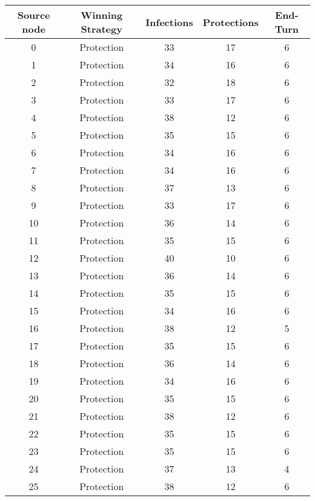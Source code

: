\documentclass[results.tex]{subfiles}
\begin{document}
\begin{center}
  \begin{tabular}{| c || c | c | c | c |}
    \hline
    {\bfseries Source node} & {\bfseries Winning Strategy} & {\bfseries Infections} & {\bfseries Protections} & {\bfseries End-Turn} \\  %
    \hline\hline
    0 & Protection & 33 & 17 & 6 \\ 
    \hline
    1 & Protection & 34 & 16 & 6 \\ 
    \hline
    2 & Protection & 32 & 18 & 6 \\ 
    \hline
    3 & Protection & 33 & 17 & 6 \\ 
    \hline
    4 & Protection & 38 & 12 & 6 \\ 
    \hline
    5 & Protection & 35 & 15 & 6 \\ 
    \hline
    6 & Protection & 34 & 16 & 6 \\ 
    \hline
    7 & Protection & 34 & 16 & 6 \\ 
    \hline
    8 & Protection & 37 & 13 & 6 \\ 
    \hline
    9 & Protection & 33 & 17 & 6 \\ 
    \hline
    10 & Protection & 36 & 14 & 6 \\ 
    \hline
    11 & Protection & 35 & 15 & 6 \\ 
    \hline
    12 & Protection & 40 & 10 & 6 \\ 
    \hline
    13 & Protection & 36 & 14 & 6 \\ 
    \hline
    14 & Protection & 35 & 15 & 6 \\ 
    \hline
    15 & Protection & 34 & 16 & 6 \\ 
    \hline
    16 & Protection & 38 & 12 & 5 \\ 
    \hline
    17 & Protection & 35 & 15 & 6 \\ 
    \hline
    18 & Protection & 36 & 14 & 6 \\ 
    \hline
    19 & Protection & 34 & 16 & 6 \\ 
    \hline
    20 & Protection & 35 & 15 & 6 \\ 
    \hline
    21 & Protection & 38 & 12 & 6 \\ 
    \hline
    22 & Protection & 35 & 15 & 6 \\ 
    \hline
    23 & Protection & 35 & 15 & 6 \\ 
    \hline
    24 & Protection & 37 & 13 & 4 \\ 
    \hline
    25 & Protection & 38 & 12 & 6 \\ 

\end{tabular}
\end{center}
\end{document}
